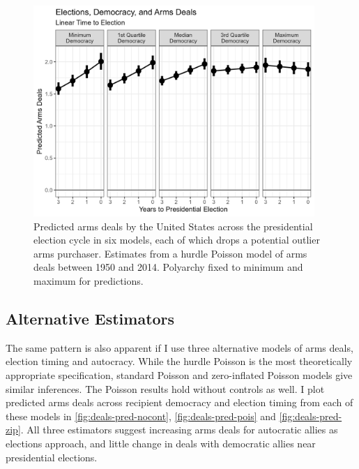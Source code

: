 \documentclass[12pt]{article}
\begin{document}
\begin{figure}[htpb]
	\centering
		\includegraphics[width=0.95\textwidth]{democ-deals-pred-lin.png}
	\caption{Predicted arms deals by the United States across the presidential election cycle in six models, each of which drops a potential outlier arms purchaser. Estimates from a hurdle Poisson model of arms deals between 1950 and 2014. Polyarchy fixed to minimum and maximum for predictions.}
	\label{fig:democ-deals-pred-lin}
\end{figure}

\subsection{Alternative Estimators}


The same pattern is also apparent if I use three alternative models of arms deals, election timing and autocracy. 
While the hurdle Poisson is the most theoretically appropriate specification, standard Poisson and zero-inflated Poisson models give similar inferences.
The Poisson results hold without controls as well.
I plot predicted arms deals across recipient democracy and election timing from each of these models in \autoref{fig:deals-pred-nocont}, \autoref{fig:deals-pred-pois} and \autoref{fig:deals-pred-zip}. 
All three estimators suggest increasing arms deals for autocratic allies as elections approach, and little change in deals with democratic allies near presidential elections. 
\end{document}
